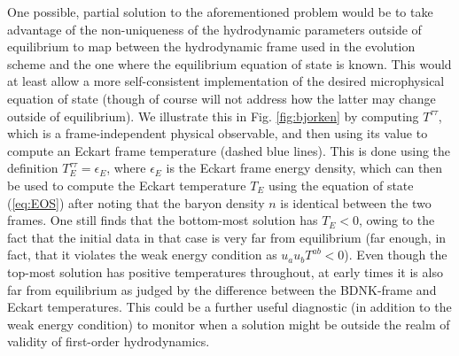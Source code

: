 \documentclass[%
notitlepage,
superscriptaddress,
nofootinbib,
amsmath,
amssymb,
aps,
twocolumn
]{revtex4-1}
\begin{document}
One possible, partial solution to the aforementioned problem
would be to take advantage of the non-uniqueness of the hydrodynamic
parameters outside of equilibrium to map between the hydrodynamic frame
used in the evolution scheme and the one where the equilibrium equation
of state is known. This would at least allow a more self-consistent
implementation of the desired microphysical equation of state (though of
course will not address how the latter may change outside of equilibrium).
We illustrate this in Fig. \ref{fig:bjorken} by computing $T^{\tau \tau}$,
which is a frame-independent physical observable, and then using its value
to compute an Eckart frame temperature (dashed blue lines).  This is done
using the definition $T^{\tau \tau}_{E} = \epsilon_{E}$, where
$\epsilon_{E}$ is the Eckart frame energy density, which can then be used
to compute the Eckart temperature $T_{E}$ using the equation of state
(\ref{eq:EOS}) after noting that the baryon density $n$ is identical
between the two frames.  One still finds that the bottom-most solution has
$T_{E} < 0$, owing to the fact that the initial data in that case is very
far from equilibrium (far enough, in fact, that it violates the weak energy
condition as $u_{a} u_{b} T^{ab} < 0$). Even though the top-most
solution has positive temperatures throughout, at early times it is also
far from equilibrium as judged by the difference between the BDNK-frame
and Eckart temperatures. This could be a further useful diagnostic (in
addition to the weak energy condition) to monitor when a solution might
be outside the realm of validity of first-order hydrodynamics.
\end{document}
